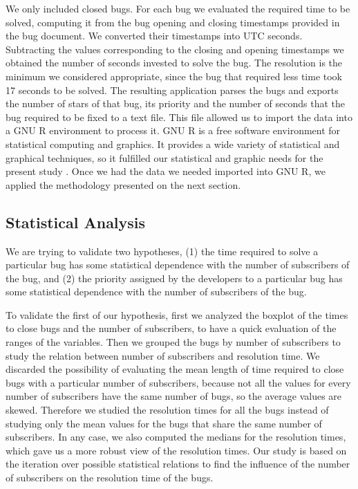 \documentclass[10pt, conference, compsocconf]{IEEEtran}
\begin{document}
We only included closed bugs. For each bug we evaluated the required time to be solved, computing it from the bug opening and closing timestamps provided in the bug document. We converted their timestamps into UTC seconds. Subtracting the values corresponding to the closing and opening timestamps we obtained the number of seconds invested to solve the bug. The resolution is the minimum we considered appropriate, since the bug that required less time took 17 seconds to be solved. The resulting application parses the bugs and exports the number of stars of that bug, its priority and the number of seconds that the bug required to be fixed to a text file. This file allowed us to import the data into a GNU R \cite{WhatIsR} environment to process it. GNU R is a free software environment for statistical computing and graphics. It provides a wide variety of statistical and graphical techniques, so it fulfilled our statistical and graphic needs for the present study \cite{RNutshell}. Once we had the data we needed imported into GNU R, we applied the methodology presented on the next section.

\subsection {Statistical Analysis}
We are trying to validate two hypotheses, (1) the time required to solve a particular bug has some statistical dependence with the number of subscribers of the bug, and (2) the priority assigned by the developers to a particular bug has some statistical dependence with the number of subscribers of the bug.

To validate the first of our hypothesis, first we analyzed the boxplot of the times to close bugs and the number of subscribers, to have a quick evaluation of the ranges of the variables. Then we grouped the bugs by number of subscribers to study the relation between number of subscribers and resolution time. We discarded the possibility of evaluating the mean length of time required to close bugs with a particular number of subscribers, because not all the values for every number of subscribers have the same number of bugs, so the average values are skewed. Therefore we studied the resolution times for all the bugs instead of studying only the mean values for the bugs that share the same number of subscribers. In any case, we also computed the medians for the resolution times, which gave us a more robust view of the resolution times.
Our study is based on the iteration over possible statistical relations to find the influence of the number of subscribers on the resolution time of the bugs.
\end{document}
